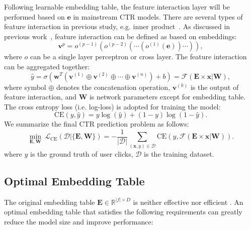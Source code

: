 \documentclass[sigconf]{acmart}
\begin{document}
Following learnable embedding table, the feature interaction layer will be performed based on $\mathbf{e}$ in mainstream CTR models. There are several types of feature interaction in previous study, e.g. inner product~\cite{DeepFM}. As discussed in previous work~\cite{AutoPI}, feature interaction can be defined as based on embeddings:
\begin{equation}
    \mathbf{v}^p = o^{(p-1)}(o^{(p-2)}(\cdots(o^{(1)}(\mathbf{e}))\cdots)),
    \label{eq:interaction}
\end{equation}
where $o$ can be a single layer perceptron or cross layer\cite{DCN}. The feature interaction can be aggregated together:
\begin{equation}
    \hat{y} = \sigma(\mathbf{w}^T(\mathbf{v}^{(1)}\oplus\mathbf{v}^{(2)}\oplus\cdots\oplus\mathbf{v}^{(n)})+b) = \mathcal{F}(\mathbf{E} \times \mathbf{x}|\mathbf{W}),
    \label{eq:aggregation}
\end{equation}
where symbol $\oplus$ denotes the concatenation operation, $\mathbf{v}^{(k)}$ is the output of feature interaction, and $\mathbf{W}$ is network parameters except for embedding table. The cross entropy loss (i.e. log-loss) is adopted for training the model:
\begin{equation}
\label{eq:logloss}
    \text{CE} (y,\hat{y}) = y\log(\hat{y}) + (1-y)\log(1-\hat{y}).
\end{equation}
We summarize the final CTR prediction problem as follows:
\begin{equation}
\label{eq:summarize}
    \min_{\mathbf{E}, \mathbf{W}} \ \mathcal{L}_{\text{CE}}(\mathcal{D}|\{\mathbf{E}, \mathbf{W}\}) = -\frac{1}{ |\mathcal{D}|} \sum_{(\mathbf{x}, y) \in \mathcal{D}} \text{CE}(y, \mathcal{F}(\mathbf{E} \times \mathbf{x}|\mathbf{W})).
\end{equation}
where $y$ is the ground truth of user clicks, $\mathcal{D}$ is the training dataset. 



\subsection{Optimal Embedding Table}
\label{sec:problem:optimal}

The original embedding table $\mathbf{E} \in \mathbb{R}^{|f| \times D}$ is neither effective nor efficient \cite{AutoDim,autofield,AutoIAS,PEP}. 
An optimal embedding table that satisfies the following requirements can greatly reduce the model size and improve performance:
\end{document}
